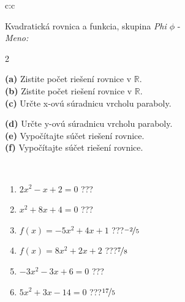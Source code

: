\documentclass[10pt]{report}
\begin{document}
\begin{tabular}{c:c}
\begin{minipage}[c][104.5mm][t]{0.5\linewidth}
\begin{center}
\vspace{7mm}
{\huge {\LARGE Kvadratická rovnica a funkcia}, skupina \textit{Phi $\phi$} -}\\[5mm]
\textit{Meno:}\phantom{xxxxxxxxxxxxxxxxxxxxxxxxxxxxxxxxxxxxxxxxxxxxxxxxxxxxxxxxxxxxxxxxx}\\[5mm]
\begin{minipage}{0.95\linewidth}
\begin{center}
{\small \begin{multicols}{2} \raggedright
\textbf{(a)} Zistite počet riešení rovnice v \(\mathbb{R}\). \\[1mm]
\textbf{(b)} Zistite počet riešení rovnice v \(\mathbb{R}\). \\[1mm]
\textbf{(c)} Určte x-ovú súradnicu vrcholu paraboly. \par \columnbreak
\textbf{(d)} Určte y-ovú súradnicu vrcholu paraboly. \\[1mm]
\textbf{(e)} Vypočítajte súčet riešení rovnice. \\[1mm]
\textbf{(f)} Vypočítajte súčet riešení rovnice.
\end{multicols}
}
\end{center}
\end{minipage}
\\[4mm]
\begin{minipage}{0.79\linewidth}
\begin{center}
\begin{varwidth}{\linewidth}
\begin{enumerate}
\Large
\item $2x^2-x+2=0$\quad \dotfill\; ???\;\dotfill {}
\item $x^2+8x+4=0$\quad \dotfill\; ???\;\dotfill {}
\item $f(x)=-5x^2+4x+1$\quad \dotfill\; ???\;\dotfill \quad $\nicefrac{-2}{5}$
\item $f(x)=8x^2+2x+2$\quad \dotfill\; ???\;\dotfill \quad $\nicefrac{7}{8}$
\item $-3x^2-3x+6=0$\quad \dotfill\; ???\;\dotfill {}
\item $5x^2+3x-14=0$\quad \dotfill\; ???\;\dotfill \quad $\nicefrac{17}{5}$
\end{enumerate}
\end{varwidth}
\end{center}

\end{minipage}
\end{center}
\end{minipage}
\end{tabular}
\end{document}
